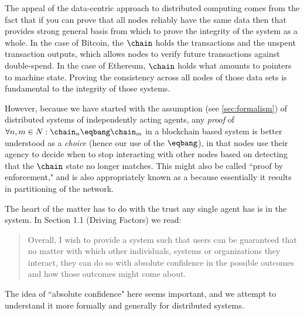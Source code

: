 \documentclass[twocolumn,showpacs,
  nofootinbib,aps,superscriptaddress,
  eqsecnum,prd,notitlepage,showkeys,10pt]{revtex4-1}
\begin{document}
The appeal of the data-centric approach to distributed computing comes from the fact that if you can prove that all nodes reliably have the same data then that provides strong general basis from which to prove the integrity of the system as a whole.  In the case of Bitcoin, the $\chain$ holds the transactions and the unspent transaction outputs, which allows nodes to verify future transactions against double-spend. In the case of Ethereum, $\chain$ holds what amounts to pointers to machine state. Proving the consistency across all nodes of those data sets is fundamental to the integrity of those systems.

However, because we have started with the assumption (see \ref{sec:formalism}) of distributed systems of independently acting agents, any \textit{proof} of  $\forall n,m \in N: \chain_n\eqbang\chain_m$ in a blockchain based system is better understood as a \textit{choice} (hence our use of the $\eqbang$),  in that nodes use their agency to decide when to stop interacting with other nodes based on detecting that the $\chain$ state no longer matches.  This might also be called  ``proof by enforcement," and is also appropriately known as a  because essentially it results in partitioning of the network.

The heart of the matter has to do with the trust any single agent has is in the system.  In \cite{yellowpaper} Section 1.1 (Driving Factors) we read:
\begin{quote}
Overall, I wish to provide a system such that users can be guaranteed that no matter with which other individuals, systems or organizations they interact, they can do so with absolute confidence in the possible outcomes and how those outcomes might come about.
\end{quote}

The idea of ``absolute confidence" here seems important, and we attempt to understand it more formally and generally for distributed systems.
\end{document}
